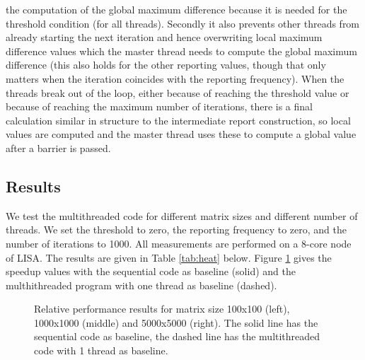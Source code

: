 \documentclass[11pt,a4paper,onecolumn]{article}
\begin{document}
the computation of the global maximum difference because it is needed for the threshold condition (for all threads). Secondly it also prevents other threads from already starting the next iteration and hence overwriting local maximum difference values which the master thread needs to compute the global maximum difference (this also holds for the other reporting values, though that only matters when the iteration coincides with the reporting frequency). When the threads break out of the loop, either because of reaching the threshold value or because of reaching the maximum number of iterations, there is a final calculation similar in structure to the intermediate report construction, so local values are computed and the master thread uses these to compute a global value after a barrier is passed.

\subsection{Results}
We test the multithreaded code for different matrix sizes and different number of threads. We set the threshold to zero, the reporting frequency to zero, and the number of iterations to 1000. All measurements are performed on a 8-core node of LISA. The results are given in Table \ref{tab:heat} below. Figure \ref{fig:heat} gives the speedup values with the sequential code as baseline (solid) and the multhithreaded program with one thread as baseline (dashed).

\begin{figure}[H]
  \centering
  \caption{Relative performance results for matrix size 100x100 (left), 1000x1000 (middle) and 5000x5000 (right). The solid line has the sequential code as baseline, the dashed line has the multithreaded code with 1 thread as baseline.}
  \label{fig:heat}
\end{figure}
\end{document}
